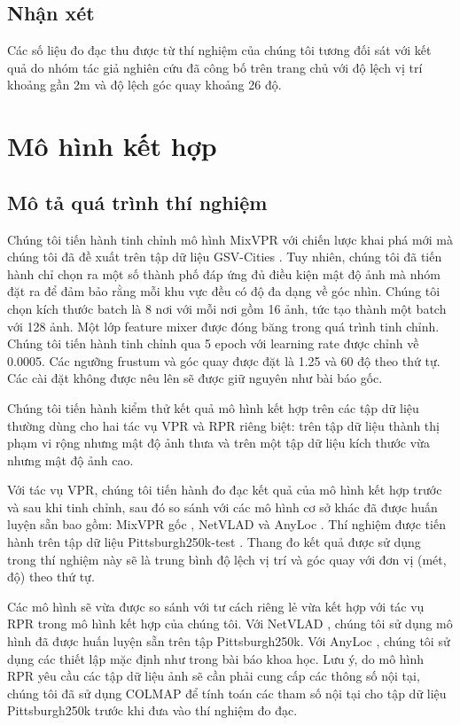 \subsection*{Nhận xét}

Các số liệu đo đạc thu được từ thí nghiệm của chúng tôi tương đối sát với kết quả do nhóm tác giả nghiên cứu đã công bố trên trang chủ với độ lệch vị trí khoảng gần 2m và độ lệch góc quay khoảng 26 độ.

\section{Mô hình kết hợp}
\subsection*{Mô tả quá trình thí nghiệm}

Chúng tôi tiến hành tinh chỉnh mô hình MixVPR \cite{alibey2023mixvpr} với chiến lược khai phá mới mà chúng tôi đã đề xuất trên tập dữ liệu GSV-Cities \cite{Ali_bey_2022}. Tuy nhiên, chúng tôi đã tiến hành chỉ chọn ra một số thành phố đáp ứng đủ điều kiện mật độ ảnh mà nhóm đặt ra để đảm bảo rằng mỗi khu vực đều có độ đa dạng về góc nhìn. Chúng tôi chọn kích thước batch là 8 nơi với mỗi nơi gồm 16 ảnh, tức tạo thành một batch với 128 ảnh. Một lớp feature mixer được đóng băng trong quá trình tinh chỉnh. Chúng tôi tiến hành tinh chỉnh qua 5 epoch với learning rate được chỉnh về 0.0005. Các ngưỡng frustum và góc quay được đặt là 1.25 và 60 độ theo thứ tự. Các cài đặt không được nêu lên sẽ được giữ nguyên như bài báo gốc.

Chúng tôi tiến hành kiểm thử kết quả mô hình kết hợp trên các tập dữ liệu thường dùng cho hai tác vụ VPR và RPR riêng biệt: trên tập dữ liệu thành thị phạm vi rộng nhưng mật độ ảnh thưa và trên một tập dữ liệu kích thước vừa nhưng mật độ ảnh cao.

Với tác vụ VPR, chúng tôi tiến hành đo đạc kết quả của mô hình kết hợp trước và sau khi tinh chỉnh, sau đó so sánh với các mô hình cơ sở khác đã được huấn luyện sẵn bao gồm: MixVPR gốc \cite{alibey2023mixvpr}, NetVLAD \cite{arandjelovic2016netvlad} và AnyLoc \cite{keetha2023anyloc}. Thí nghiệm được tiến hành trên tập dữ liệu Pittsburgh250k-test \cite{6618963}. Thang đo kết quả được sử dụng trong thí nghiệm này sẽ là trung bình độ lệch vị trí và góc quay với đơn vị (mét, độ) theo thứ tự.

Các mô hình sẽ vừa được so sánh với tư cách riêng lẻ vừa kết hợp với tác vụ RPR trong mô hình kết hợp của chúng tôi. Với NetVLAD \cite{arandjelovic2016netvlad}, chúng tôi sử dụng mô hình đã được huấn luyện sẵn trên tập Pittsburgh250k. Với AnyLoc \cite{keetha2023anyloc},  chúng tôi sử dụng các thiết lập mặc định như trong bài báo khoa học. Lưu ý, do mô hình RPR yêu cầu các tập dữ liệu ảnh sẽ cần phải cung cấp các thông số nội tại, chúng tôi đã sử dụng COLMAP để tính toán các tham số nội tại cho tập dữ liệu Pittsburgh250k trước khi đưa vào thí nghiệm đo đạc.

